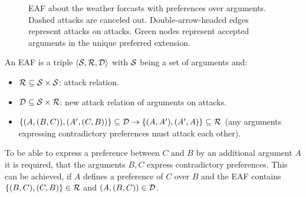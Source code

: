 \begin{figure}[b!]
\centering
{}
\caption{\gls{EAF} about the weather forcasts with preferences over arguments. Dashed attacks are canceled out. Double-arrow-headed edges represent attacks on attacks. Green nodes represent accepted arguments in the unique preferred extension.}
\label{fig:eaf_intro}
\end{figure}


\begin{definition}
	An \gls{EAF} is a triple $\langle \S, \R, \D \rangle$ with $\S$ being a set of arguments and:
	\begin{itemize}
		\item $\R \subseteq \S \times \S$: attack relation.
		\item $\D \subseteq \S \times \R$: new attack relation of arguments on attacks.
		\item $\{(A, (B, C)), (A', (C, B))\} \subseteq \D \rightarrow \{(A, A'), (A', A)\} \subseteq \R$ (any arguments expressing contradictory preferences must attack each other).
	\end{itemize}
\end{definition}

\begin{remark}
To be able to express a preference between $C$ and $B$ by an additional argument $A$ it is required, that the arguments $B, C$ express contradictory preferences. This can be achieved, if $A$ defines a preference of $C$ over $B$ and the \gls{EAF} contains $\{(B, C), (C, B)\} \in \R$ and $(A, (B, C)) \in \D$. 
\end{remark}

